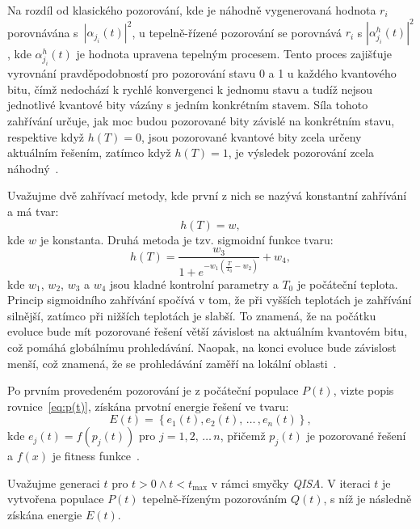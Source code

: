 Na rozdíl od klasického pozorování, kde je náhodně vygenerovaná hodnota $r_i$ porovnávána s~$\left|\alpha_{j_i}\left(t\right) \right|^2$, u tepelně-řízené pozorování se porovnává $r_i$ s $\left|\alpha_{j_i}^h\left(t\right) \right|^2$, kde $\alpha_{j_i}^h\left(t\right)$ je hodnota upravena tepelným procesem.
Tento proces zajišťuje vyrovnání pravděpodobností pro pozorování stavu 0 a 1 u každého kvantového bitu, čímž nedochází k rychlé konvergenci k jednomu stavu a tudíž nejsou jednotlivé kvantové bity vázány s jedním konkrétním stavem. 
Síla tohoto zahřívání určuje, jak moc budou pozorované bity závislé na konkrétním stavu, respektive když $h\left(T\right) = 0$, jsou pozorované kvantové bity zcela určeny aktuálním řešením, zatímco když $h\left(T\right) = 1$, je výsledek pozorování zcela náhodný~\cite{qisa}. 

Uvažujme dvě zahřívací metody, kde první z nich se nazývá konstantní zahřívání a má tvar:
\begin{equation}\label{eq:qisa-const}
    h\left(T\right) = w,
\end{equation}
kde $w$ je konstanta. Druhá metoda je tzv. sigmoidní funkce tvaru:
\begin{equation}\label{eq:qisa-sigmo}
    h\left(T\right) = \frac{w_3}{1 + e^{-w_1 \left(\frac{T}{T_0} - w_2 \right)}} + w_4,
\end{equation}
kde $w_1$, $w_2$, $w_3$ a $w_4$ jsou kladné kontrolní parametry a $T_0$ je počáteční teplota. 
Princip sigmoidního zahřívání spočívá v tom, že při vyšších teplotách je zahřívání silnější, zatímco při nižších teplotách je slabší.
To znamená, že na počátku evoluce bude mít pozorované řešení větší závislost na aktuálním kvantovém bitu, což pomáhá globálnímu prohledávání. Naopak, na konci evoluce bude závislost menší, což znamená, že se prohledávání zaměří na lokální oblasti~\cite{qisa}. 

Po prvním provedeném pozorování je z počáteční populace $P\left(t\right)$, vizte popis rovnice~\ref{eq:p(t)}, získána prvotní energie řešení ve tvaru:
\begin{equation*}
    E\left(t\right) = \left\{ e_1\left(t\right), e_2\left(t\right),\,\dots\,, e_n\left(t\right) \right\},
\end{equation*}
kde $e_j \left( t \right) = f\left( p_j \left( t \right) \right)$ pro $j = 1,2,\,\dots\,n$, přičemž $p_j\left( t \right)$ je pozorované řešení a $f\left( x \right)$ je fitness funkce~\cite{qisa}.

Uvažujme generaci $t$ pro $t>0 \wedge t < t_{\text{max}}$ v rámci smyčky \emph{QISA}. 
V iteraci $t$ je vytvořena populace $P\left(t\right)$ tepelně-řízeným pozorováním $Q\left(t\right)$, s níž je následně získána energie $E\left(t\right)$.

